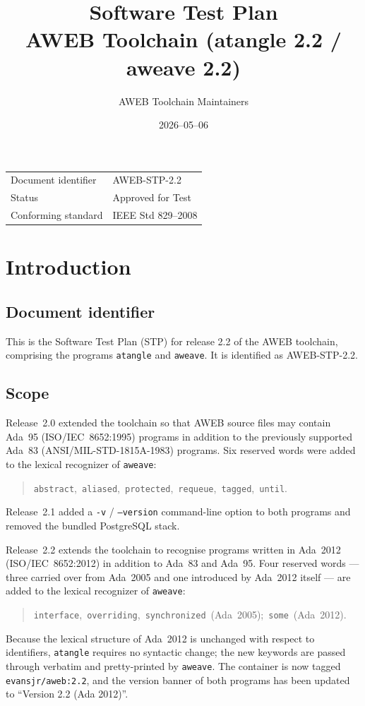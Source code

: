 \documentclass[11pt]{article}
\title{Software Test Plan\\\large AWEB Toolchain (\textsf{atangle} 2.2 / \textsf{aweave} 2.2)}
\author{AWEB Toolchain Maintainers}
\date{2026--05--06}
\newcommand{\stpid}{AWEB-STP-2.2}
\begin{document}
\maketitle

\begin{center}
\begin{tabular}{ll}
\toprule
Document identifier   & \stpid\\
Status                & Approved for Test\\
Conforming standard   & IEEE Std 829--2008\\
\bottomrule
\end{tabular}
\end{center}

\tableofcontents
\bigskip

\section{Introduction}

\subsection{Document identifier}
This is the Software Test Plan (STP) for release 2.2 of the AWEB
toolchain, comprising the programs \texttt{atangle} and \texttt{aweave}.
It is identified as \stpid.

\subsection{Scope}
Release~2.0 extended the toolchain so that AWEB source files may contain
Ada~95 (ISO/IEC~8652:1995) programs in addition to the previously
supported Ada~83 (ANSI/MIL-STD-1815A-1983) programs.  Six reserved
words were added to the lexical recognizer of \texttt{aweave}:
\begin{quote}
\texttt{abstract},\ \texttt{aliased},\ \texttt{protected},\
\texttt{requeue},\ \texttt{tagged},\ \texttt{until}.
\end{quote}
Release~2.1 added a \texttt{-v} / \texttt{--version} command-line option
to both programs and removed the bundled PostgreSQL stack.

Release~2.2 extends the toolchain to recognise programs written in
Ada~2012 (ISO/IEC~8652:2012) in addition to Ada~83 and Ada~95.  Four
reserved words --- three carried over from Ada~2005 and one introduced
by Ada~2012 itself --- are added to the lexical recognizer of
\texttt{aweave}:
\begin{quote}
\texttt{interface},\ \texttt{overriding},\ \texttt{synchronized}\
(Ada~2005);\ \texttt{some}\ (Ada~2012).
\end{quote}
Because the lexical structure of Ada~2012 is unchanged with respect to
identifiers, \texttt{atangle} requires no syntactic change; the new
keywords are passed through verbatim and pretty-printed by
\texttt{aweave}.  The container is now tagged
\texttt{evansjr/aweb:2.2}, and the version banner of both programs has
been updated to ``Version 2.2 (Ada 2012)''.
\end{document}
